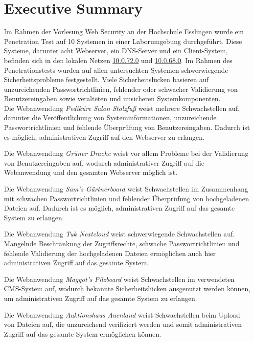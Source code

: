 \newpage
\chapter{Executive Summary}
Im Rahmen der Vorlesung Web Security an der Hochschule Esslingen wurde ein Penetration Test auf 10 Systemen in einer Laborumgebung durchgeführt. Diese Systeme, darunter acht Webserver, ein DNS-Server und ein Client-System, befinden sich in den lokalen Netzen \url{10.0.72.0} und \url{10.0.68.0}. Im Rahmen des Penetrationstests wurden auf allen untersuchten Systemen schwerwiegende Sicherheitsprobleme festgestellt. Viele Sicherheitslücken basieren auf unzureichenden Passwortrichtlinien, fehlender oder schwacher Validierung von Benutzereingaben sowie veralteten und unsicheren Systemkomponenten.\\

\noindent Die Webanwendung \textit{Pediküre Salon Stolzfuß} weist mehrere Schwachstellen auf, darunter die Veröffentlichung von Systeminformationen, unzureichende Passwortrichtlinien und fehlende Überprüfung von Benutzereingaben. Dadurch ist es möglich, administrativen Zugriff auf den Webserver zu erlangen.

\noindent Die Webanwendung \textit{Grüner Drache} weist vor allem Probleme bei der Validierung von Benutzereingaben auf, wodurch administrativer Zugriff auf die Webanwendung und den gesamten Webserver möglich ist.

\noindent Die Webanwendung \textit{Sam's Gärtnerboard} weist Schwachstellen im Zusammenhang mit schwachen Passwortrichtlinien und fehlender Überprüfung von hochgeladenen Dateien auf. Dadurch ist es möglich, administrativen Zugriff auf das gesamte System zu erlangen.

\noindent Die Webanwendung \textit{Tuk Nextcloud} weist schwerwiegende Schwachstellen auf. Mangelnde Beschränkung der Zugriffsrechte, schwache Passwortrichtlinien und fehlende Validierung der hochgeladenen Dateien ermöglichen auch hier administrativen Zugriff auf das gesamte System.

\noindent Die Webanwendung \textit{Maggot's Pilzboard} weist Schwachstellen im verwendeten CMS-System auf, wodurch bekannte Sicherheitslücken ausgenutzt werden können, um administrativen Zugriff auf das gesamte System zu erlangen.

\noindent Die Webanwendung \textit{Auktionshaus Auenland} weist Schwachstellen beim Upload von Dateien auf, die unzureichend verifiziert werden und somit administrativen Zugriff auf das gesamte System ermöglichen können.

